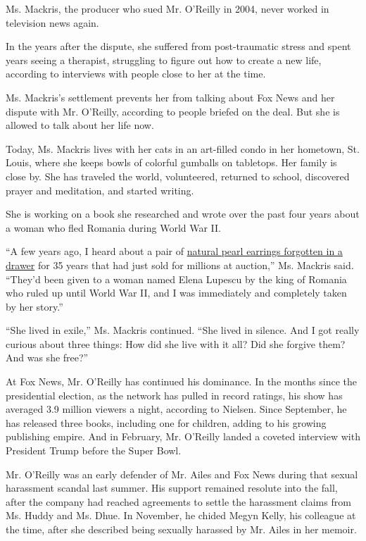 Ms. Mackris, the producer who sued Mr. O'Reilly in 2004, never worked in
television news again.

In the years after the dispute, she suffered from post-traumatic stress
and spent years seeing a therapist, struggling to figure out how to
create a new life, according to interviews with people close to her at
the time.

Ms. Mackris's settlement prevents her from talking about Fox News and
her dispute with Mr. O'Reilly, according to people briefed on the deal.
But she is allowed to talk about her life now.

Today, Ms. Mackris lives with her cats in an art-filled condo in her
hometown, St. Louis, where she keeps bowls of colorful gumballs on
tabletops. Her family is close by. She has traveled the world,
volunteered, returned to school, discovered prayer and meditation, and
started writing.

She is working on a book she researched and wrote over the past four
years about a woman who fled Romania during World War II.

``A few years ago, I heard about a pair of
\href{http://www.itv.com/news/meridian/2012-04-25/royal-earrings-set-to-fetch-600-000/}{natural
pearl earrings forgotten in a drawer} for 35 years that had just sold
for millions at auction,'' Ms. Mackris said. ``They'd been given to a
woman named Elena Lupescu by the king of Romania who ruled up until
World War II, and I was immediately and completely taken by her story.''

``She lived in exile,'' Ms. Mackris continued. ``She lived in silence.
And I got really curious about three things: How did she live with it
all? Did she forgive them? And was she free?''

At Fox News, Mr. O'Reilly has continued his dominance. In the months
since the presidential election, as the network has pulled in record
ratings, his show has averaged 3.9 million viewers a night, according to
Nielsen. Since September, he has released three books, including one for
children, adding to his growing publishing empire. And in February, Mr.
O'Reilly landed a coveted interview with President Trump before the
Super Bowl.

Mr. O'Reilly was an early defender of Mr. Ailes and Fox News during that
sexual harassment scandal last summer. His support remained resolute
into the fall, after the company had reached agreements to settle the
harassment claims from Ms. Huddy and Ms. Dhue. In November, he chided
Megyn Kelly, his colleague at the time, after she described being
sexually harassed by Mr. Ailes in her memoir.

